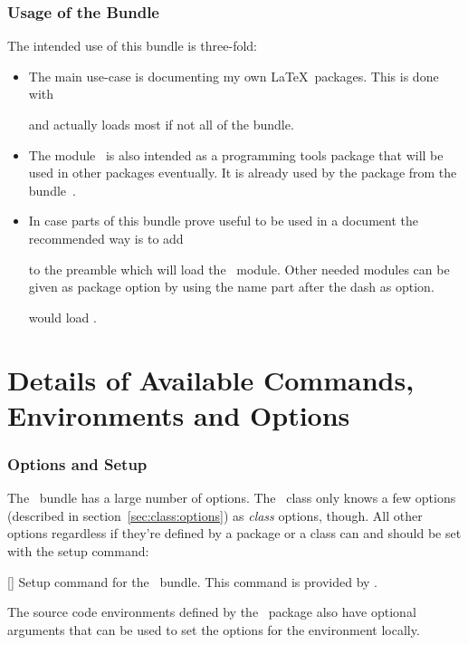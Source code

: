 \documentclass[load-preamble+,babel-options={ngerman,english}]{cnltx-doc}
\begin{document}
\section{Usage of the Bundle}\label{sec:usage-bundle}
The intended use of this bundle is three-fold:
\begin{itemize}
  \item The main use-case is documenting my own \LaTeX\ packages.  This is
    done with
    and actually loads most if not all of the bundle.
  \item The module \cnltxbase\ is also intended as a programming tools package
    that will be used in other packages eventually.  It is already used by the
     package from the 
    bundle~\cite{bnd:exsheets}.
  \item In case parts of this bundle prove useful to be used in a document the
    recommended way is to add
    \begin{sourcecode}[gobble=6]
      \usepackage{cnltx}
    \end{sourcecode}
    to the preamble which will load the \cnltxbase\ module.  Other needed
    modules can be given as package option by using the name part after the
    dash as option.
    \begin{sourcecode}[gobble=6]
      \usepackage[example]{cnltx}
    \end{sourcecode}
    would load \cnltxexample.
\end{itemize}

\part{Details of Available Commands, Environments and Options}

\section{Options and Setup}
The \cnltx\ bundle has a large number of options.  The \cnltxdoc\ class only
knows a few options (described in section~\vref{sec:class:options}) as
\emph{class} options, though.  All other options regardless if they're defined
by a package or a class can and should be set with the setup command:
\begin{commands}
  []
    Setup command for the \cnltx\ bundle.  This command is provided by
    \cnltxbase.
\end{commands}
The source code environments defined by the \cnltxexample\ package also have
optional arguments that can be used to set the options for the environment
locally.
\end{document}
